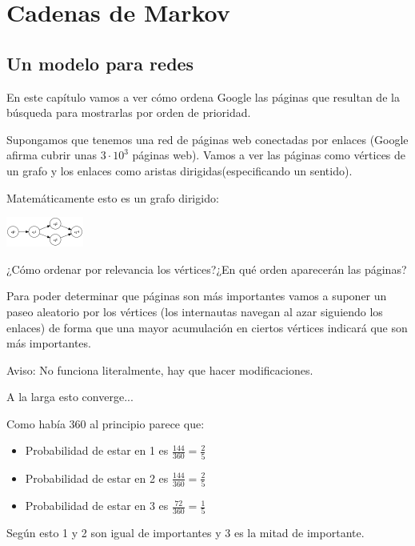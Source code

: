 \chapter{Cadenas de Markov}

\section{Un modelo para redes}
En este capítulo vamos a ver cómo ordena Google las páginas que resultan de la búsqueda para mostrarlas por orden de prioridad.

Supongamos que tenemos una red de páginas web conectadas por enlaces (Google afirma cubrir unas $3\cdot 10^3$ páginas web). Vamos a ver las páginas como vértices de un grafo y los enlaces como aristas dirigidas(especificando un sentido).

Matemáticamente esto es un grafo dirigido:
\begin{center}
\includegraphics{tex/ejemplo_dibujo.png}
\end{center}
¿Cómo ordenar por relevancia los vértices?¿En qué orden aparecerán las páginas?


Para poder determinar que páginas son más importantes vamos a suponer un paseo aleatorio por los vértices (los internautas navegan al azar siguiendo los enlaces) de forma que una mayor acumulación en ciertos vértices indicará que son más importantes.


Aviso: No funciona literalmente, hay que hacer modificaciones.

A la larga esto converge...
\begin{center}
	\centering
\end{center}




Como había 360 al principio parece que:


\begin{itemize}
	\item Probabilidad de estar en 1 es $\frac{144}{360} = \frac{2}{5}$
	\item Probabilidad de estar en 2 es $\frac{144}{360} = \frac{2}{5}$
	\item Probabilidad de estar en 3 es $\frac{72}{360} = \frac{1}{5}$
\end{itemize}
	Según esto 1 y 2 son igual de importantes y 3 es la mitad de importante.

